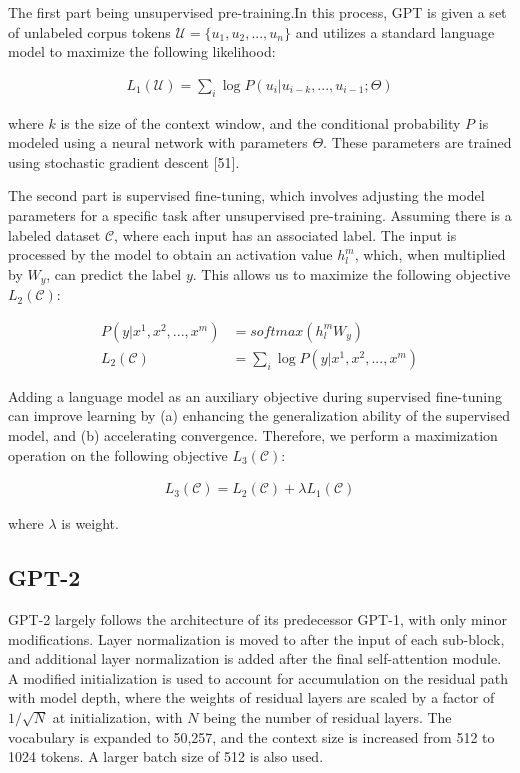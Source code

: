 \documentclass[conference]{IEEEtran}
\begin{document}
\par The first part being unsupervised pre-training.In this process, GPT is given a 
set of unlabeled corpus tokens $\mathcal{U} = \{u_1, u_2, ..., u_n \}$ and utilizes a standard language model to maximize 
the following likelihood:

\begin{align*}
    L_1(\mathcal{U}) = \sum_{i}\log P(u_i | u_{i-k}, ..., u_{i-1};\Theta )
\end{align*}

\par where $k$ is the size of the context window, and the conditional probability $P$ is 
modeled using a neural network with parameters $\Theta$. These parameters are trained 
using stochastic gradient descent [51].

The second part is supervised fine-tuning, which involves adjusting the model parameters 
for a specific task after unsupervised pre-training. Assuming there is a labeled 
dataset $\mathcal{C} $, where each input has an associated label. The input is processed by the 
model to obtain an activation value $h^m_l$, which, when multiplied by $W_y$, can predict the 
label $y$. This allows us to maximize the following objective $L_2(\mathcal{C})$:

\begin{align*}
    P(y | x^1, x^2, ..., x^m) &= softmax(h_l^m W_y) \\
    L_2(\mathcal{C}) &= \sum_{i}\log P(y | x^1, x^2, ..., x^m)
\end{align*}

Adding a language model as an auxiliary objective during supervised fine-tuning 
can improve learning by (a) enhancing the generalization ability of the supervised 
model, and (b) accelerating convergence. Therefore, we perform a maximization operation 
on the following objective $L_3(\mathcal{C})$:

\begin{align*}
    L_3(\mathcal{C}) = L_2(\mathcal{C}) + \lambda L_1(\mathcal{C})
\end{align*}

\par where $\lambda$ is weight.

\subsection{GPT-2}

\par GPT-2\cite{b4} largely follows the architecture of its predecessor GPT-1, 
with only minor modifications. Layer normalization is moved to after the input 
of each sub-block, and additional layer normalization is added after the final 
self-attention module. A modified initialization is used to account for accumulation 
on the residual path with model depth, where the weights of residual layers are scaled 
by a factor of $1/\sqrt{N}$ at initialization, with $N$ being the number of residual layers. 
The vocabulary is expanded to 50,257, and the context size is increased from 512 to 
1024 tokens. A larger batch size of 512 is also used.
\end{document}
